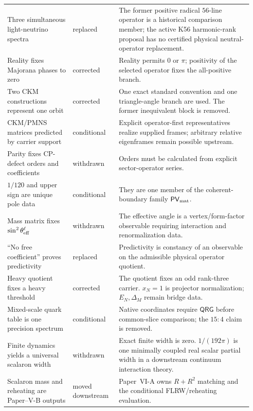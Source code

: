 \documentclass[12pt,a4paper]{article}
\begin{document}
\begin{longtable}{@{}L{0.29\textwidth}L{0.19\textwidth}
L{0.44\textwidth}@{}}
Three simultaneous light-neutrino spectra
& replaced
& The former positive radical \(56\)-line operator is a historical
comparison member; the active K56 harmonic-rank proposal has no certified
physical neutral-operator replacement.\\

Reality fixes Majorana phases to zero
& corrected
& Reality permits \(0\) or \(\pi\); positivity of the selected operator fixes
the all-positive branch.\\

Two CKM constructions represent one orbit
& corrected
& One exact standard convention and one triangle-angle branch are used.
The former inequivalent block is removed.\\

CKM/PMNS matrices predicted by carrier support
& conditional
& Explicit operator-first representatives realize supplied frames; arbitrary
relative eigenframes remain possible upstream.\\

Parity fixes CP-defect orders and coefficients
& withdrawn
& Orders must be calculated from explicit sector-operator series.\\

\(1/120\) and upper sign are unique pole data
& conditional
& They are one member of the coherent-boundary family
\(\mathsf{PV}_{\rm mat}\).\\

Mass matrix fixes \(\sin^2\theta_{\rm eff}^\ell\)
& withdrawn
& The effective angle is a vertex/form-factor observable requiring
interaction and renormalization data.\\

``No free coefficient'' proves predictivity
& replaced
& Predictivity is constancy of an observable on the admissible physical
operator quotient.\\

Heavy quotient fixes a heavy threshold
& corrected
& The quotient fixes an odd rank-three carrier.  \(x_N=1\) is projector
normalization; \(E_N,\Delta_M\) remain bridge data.\\

Mixed-scale quark table is one precision spectrum
& conditional
& Native coordinates require \(\mathsf{QRG}\) before common-slice
comparison; the \(15:4\) claim is removed.\\

Finite dynamics yields a universal scalaron width
& withdrawn
& Exact finite width is zero.  \(1/(192\pi)\) is one minimally coupled real
scalar partial width in a downstream continuum interaction theory.\\

Scalaron mass and reheating are Paper--V-B outputs
& moved downstream
& Paper~VI-A owns \(R+R^2\) matching and the conditional FLRW/reheating
evaluation.\\
\end{longtable}
\end{document}
